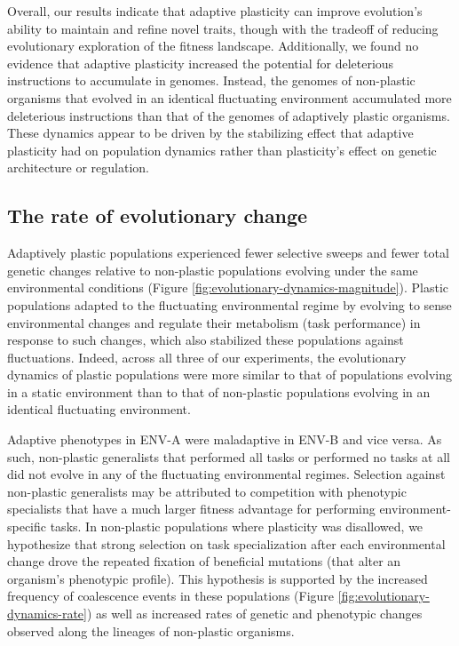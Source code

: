 Overall, our results indicate that adaptive plasticity can improve evolution's ability to maintain and refine novel traits, though with the tradeoff of reducing evolutionary exploration of the fitness landscape.
Additionally, we found no evidence that adaptive plasticity increased the potential for deleterious instructions to accumulate in genomes.
Instead, the genomes of non-plastic organisms that evolved in an identical fluctuating environment accumulated more deleterious instructions than that of the genomes of adaptively plastic organisms. 
These dynamics appear to be driven by the stabilizing effect that adaptive plasticity had on population dynamics rather than plasticity's effect on genetic architecture or regulation.

\vspace{0.25cm}
\subsection{The rate of evolutionary change}

Adaptively plastic populations experienced fewer selective sweeps and fewer total genetic changes relative to non-plastic populations evolving under the same environmental conditions (Figure \ref{fig:evolutionary-dynamics-magnitude}).
Plastic populations adapted to the fluctuating environmental regime by evolving to sense environmental changes and regulate their metabolism (task performance) in response to such changes, which also stabilized these populations against fluctuations.
Indeed, across all three of our experiments, the evolutionary dynamics of plastic populations were more similar to that of populations evolving in a static environment than to that of non-plastic populations evolving in an identical fluctuating environment.

Adaptive phenotypes in ENV-A were maladaptive in ENV-B and vice versa.
As such, non-plastic generalists that performed all tasks or performed no tasks at all did not evolve in any of the fluctuating environmental regimes.
Selection against non-plastic generalists may be attributed to competition with phenotypic specialists that have a much larger fitness advantage for performing environment-specific tasks.
In non-plastic populations where plasticity was disallowed, we hypothesize that strong selection on task specialization after each environmental change drove the repeated fixation of beneficial mutations (that alter an organism's phenotypic profile).
This hypothesis is supported by the increased frequency of coalescence events in these populations (Figure \ref{fig:evolutionary-dynamics-rate}) as well as increased rates of genetic and phenotypic changes observed along the lineages of non-plastic organisms. 

